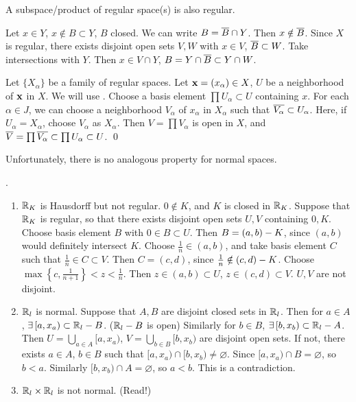  A subspace/product of regular space(s) is also regular.

\pf
{} Let \(x \in Y\), \(x \notin B \subset Y\), \(B\) closed. We can write \(B = \cl{B} \cap Y\). Then \(x \notin \cl{B}\). Since \(X\) is regular, there exists disjoint open sets \(V, W\) with \(x \in V\), \(\cl{B} \subset W\). Take intersections with \(Y\). Then \(x \in V \cap Y\), \(B = Y \cap \cl{B} \subset Y \cap W\).

 Let \(\{X_\alpha\}\) be a family of regular spaces. Let \(\bf{x} = (x_\alpha) \in X\), \(U\) be a neighborhood of \(\bf{x}\) in \(X\). We will use . Choose a basis element \(\prod U_\alpha \subset U\) containing \(x\). For each \(\alpha \in J\), we can choose a neighborhood \(V_\alpha\) of \(x_\alpha\) in \(X_\alpha\) such that \(\cl{V_\alpha} \subset U_\alpha\). Here, if \(U_\alpha = X_\alpha\), choose \(V_\alpha\) as \(X_\alpha\). Then \(V = \prod V_\alpha\) is open in \(X\), and \(\cl{V} = \prod \cl{V_\alpha} \subset \prod U_\alpha \subset U\). \qed

\rmk Unfortunately, there is no analogous property for normal spaces.

\ex.
\begin{enumerate}
    \item \(\R_K\) is Hausdorff but not regular. \(0 \notin K\), and \(K\) is closed in \(\R_K\). Suppose that \(\R_K\) is regular, so that there exists disjoint open sets \(U, V\) containing \(0, K\). Choose basis element \(B\) with \(0 \in B \subset U\). Then \(B = (a, b) \bs K\), since \((a, b)\) would definitely intersect \(K\). Choose \(\frac{1}{n} \in (a, b)\), and take basis element \(C\) such that \(\frac{1}{n} \in C \subset V\). Then \(C = (c, d)\), since \(\frac{1}{n} \notin (c, d) \bs K\). Choose \(\max\left\{c, \frac{1}{n+1}\right\} < z < \frac{1}{n}\). Then \(z \in (a, b) \subset U\), \(z \in (c, d) \subset V\). \(U, V\) are not disjoint.

    \item \(\R_l\) is normal. Suppose that \(A, B\) are disjoint closed sets in \(\R_l\). Then for \(a \in A\), \(\exists [a, x_a) \subset \R_l \bs B\). (\(\R_l \bs B\) is open) Similarly for \(b\in B\), \(\exists [b, x_b) \subset \R_l \bs A\). Then \(U = \bigcup_{a \in A} [a, x_a)\), \(V = \bigcup_{b \in B} [b, x_b)\) are disjoint open sets. If not, there exists \(a \in A\), \(b\in B\) such that \([a, x_a) \cap [b, x_b) \neq \varnothing\). Since \([a, x_a) \cap B = \varnothing\), so \(b < a\). Similarly \([b, x_b) \cap A = \varnothing\), so \(a < b\). This is a contradiction.
    \item \(\R_l \times \R_l\) is not normal. (Read!)
\end{enumerate}

